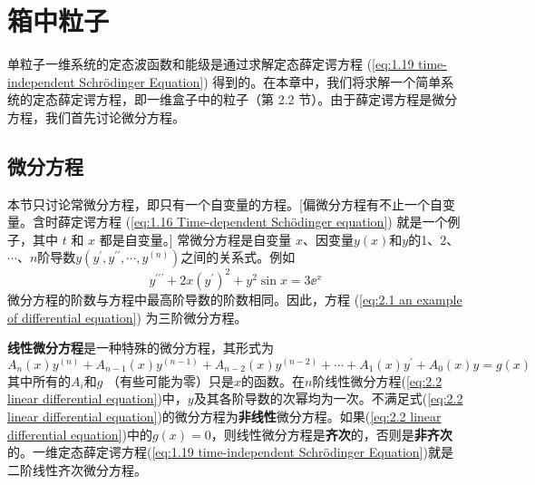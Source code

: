 \chapter{箱中粒子}
\label{chap:2}
	单粒子一维系统的定态波函数和能级是通过求解定态薛定谔方程 (\ref{eq:1.19 time-independent Schrödinger Equation}) 得到的。在本章中，我们将求解一个简单系统的定态薛定谔方程，即一维盒子中的粒子（第 2.2 节）。由于薛定谔方程是微分方程，我们首先讨论微分方程。
\section{微分方程}
\label{sec:2.1 Differential Equations}
	本节只讨论常微分方程，即只有一个自变量的方程。[偏微分方程有不止一个自变量。含时薛定谔方程 (\ref{eq:1.16 Time-dependent Schödinger equation}) 就是一个例子，其中 $t$ 和 $x$ 都是自变量。]
	常微分方程是自变量 $x$、因变量$y\left(x\right)$和$y$的1、2、$\cdots$、$n$阶导数$y\left(y^{\prime},y^{\prime\prime}, \cdots, y^{\left(n\right)}\right)$之间的关系式。例如
	\begin{equation}
		y^{\prime\prime\prime}+2x\left(y^{\prime}\right)^2+y^2\sin x = 3\ee^x
		\label{eq:2.1 an example of differential equation}
	\end{equation}
	微分方程的阶数与方程中最高阶导数的阶数相同。因此，方程 (\ref{eq:2.1 an example of differential equation}) 为三阶微分方程。

	\textbf{线性微分方程}是一种特殊的微分方程，其形式为
	\begin{equation}
		A_n\left(x\right)y^{\left(n\right)}+A_{n-1}\left(x\right)y^{\left(n-1\right)}+A_{n-2}\left(x\right)y^{\left(n-2\right)}+\cdots+A_1\left(x\right)y^{\prime}+A_0\left(x\right)y=g\left(x\right)
		\label{eq:2.2 linear differential equation}
	\end{equation}
	其中所有的$A_i$和$g$ （有些可能为零）只是$x$的函数。在$n$阶线性微分方程(\ref{eq:2.2 linear differential equation})中，$y$及其各阶导数的次幂均为一次。不满足式(\ref{eq:2.2 linear differential equation})的微分方程为\textbf{非线性}微分方程。如果(\ref{eq:2.2 linear differential equation})中的$g\left(x\right)=0$，则线性微分方程是\textbf{齐次}的，否则是\textbf{非齐次}的。一维定态薛定谔方程(\ref{eq:1.19 time-independent Schrödinger Equation})就是二阶线性齐次微分方程。


